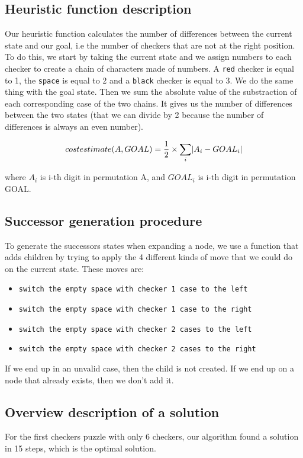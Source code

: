 \documentclass{article}
\begin{document}
\subsection{Heuristic function description}
Our heuristic function calculates the number of differences between the current
state and our goal, i.e the number of checkers that are not at the right
position.
To do this, we start by taking the current state and we assign numbers to each
checker to create a chain of characters made of numbers. A \texttt{red} checker
is equal to 1, the \texttt{space} is equal to 2 and a \texttt{black} checker is
equal to 3. We do the same thing with the goal state. Then we sum the absolute
value of the substraction of each corresponding case of the two chains. It gives
us the number of differences between the two states (that we can divide by 2
because the number of differences is always an even number).

\[
cost estimate (A, GOAL) = \frac{1}{2} \times \sum_i \lvert A_i - GOAL_i\rvert
\]

where $A_i$ is i-th digit in permutation A, and $GOAL_i$ is i-th
digit in permutation GOAL. 

\subsection{Successor generation procedure}
To generate the successors states when expanding a node, we use a function that
adds children by trying to apply the 4 different kinds of move that we could do
on the current state. These moves are:
\begin{itemize}
  \item \texttt{switch the empty space with checker 1 case to the left}
  \item \texttt{switch the empty space with checker 1 case to the right}
  \item \texttt{switch the empty space with checker 2 cases to the left}
  \item \texttt{switch the empty space with checker 2 cases to the right}
\end{itemize}


If we end up in an unvalid case, then the child is not created.
If we end up on a node that already exists, then we don't add it.

\subsection{Overview description of a solution}
For the first checkers puzzle with only 6 checkers, our algorithm found a
solution in 15 steps, which is the optimal solution.
\end{document}
